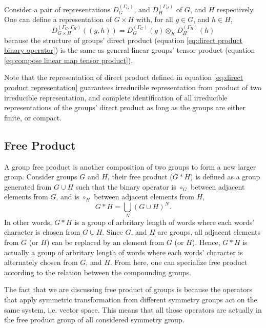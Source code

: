 \documentclass[preprint, 12pt]{revtex4-2}
\numberwithin{equation}{section}
\begin{document}
Consider a pair of representations $D^{(\Gamma_G)}_G$, and $D^{(\Gamma_H)}_H$ of $G$, and $H$ respectively. One can define a representation of $G\times H$ with, for all $g\in G$, and $h\in H$,
\begin{equation}\label{eq:direct product representation}
    D^{(\Gamma_G,\Gamma_H)}_{G\times H}((g,h)) = D^{(\Gamma_G)}_G(g)\otimes_K D^{(\Gamma_H)}_H(h)
\end{equation}
because the structure of groups' direct product (equation \ref{eq:direct product binary operator}) is the same as general linear groups' tensor product (equation \ref{eq:compose linear map tensor product}).

Note that the representation of direct product defined in equation \ref{eq:direct product representation} guarantees irreducible representation from product of two irreducible representation, and complete identification of all irreducible representations of the groups' direct product as long as the groups are either finite, or compact.

\subsection{Free Product}
A group free product is another composition of two groups to form a new larger group. Consider groups $G$ and $H$, their free product ($G\ast H$) is defined as a group generated from $G\cup H$ such that the binary operator is $\circ_G$ between adjacent elements from $G$, and is $\circ_H$ between adjacent elements from $H$,
\begin{equation}\label{eq:free product}
    G\ast H = \bigcup_{N}(G\cup H)^N.
\end{equation}
In other words, $G\ast H$ is a group of arbritary length of words where each words' character is chosen from $G\cup H$. Since $G$, and $H$ are groups, all adjacent elements from $G$ (or $H$) can be replaced by an element from $G$ (or $H$). Hence, $G\ast H$ is actually a group of arbritary length of words where each words' character is alternately chosen from $G$, and $H$. From here, one can specialize free product according to the relation between the compounding groups.

The fact that we are discussing free product of groups is because the operators that apply symmetric transformation from different symmetry groups act on the same system, i.e. vector space. This means that all those operators are actually in the free product group of all considered symmetry group.
\end{document}
